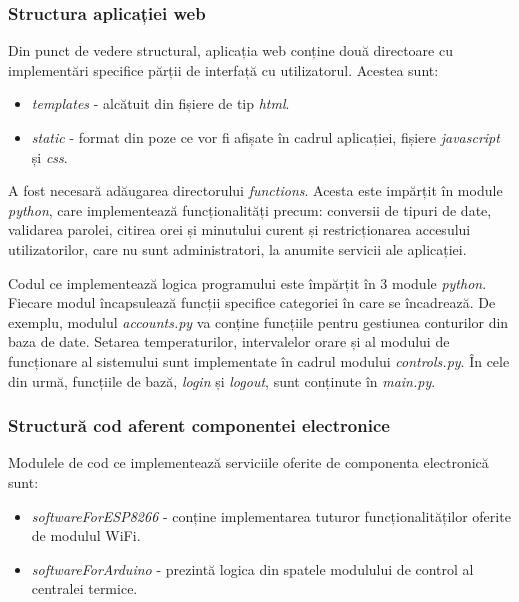 \subsubsection{Structura aplicației web}

	Din punct de vedere structural, aplicația web conține două directoare cu implementări specifice părții de interfață cu utilizatorul. Acestea sunt:
	\begin{itemize}
		\setlength{\itemindent}{2em}
			\itemsep0em
			\item \textit{templates} - alcătuit din fișiere de tip \textit{html}.
			\item \textit{static} - format din poze ce vor fi afișate în cadrul aplicației, fișiere \textit{javascript} și \textit{css}.
	\end{itemize}

	A fost necesară adăugarea directorului \textit{functions}. Acesta este impărțit în module \textit{python}, care implementează funcționalități precum: conversii de tipuri de date, validarea parolei, citirea orei și minutului curent și restricționarea accesului utilizatorilor, care nu sunt administratori, la anumite servicii ale aplicației.

	Codul ce implementează logica programului este împărțit în 3 module \textit{python}. Fiecare modul încapsulează funcții specifice categoriei în care se încadrează. De exemplu, modulul \textit{accounts.py} va conține funcțiile pentru gestiunea conturilor din baza de date. Setarea temperaturilor, intervalelor orare și al modului de funcționare al sistemului sunt implementate în cadrul modului \textit{controls.py}. În cele din urmă, funcțiile de bază, \textit{login} și \textit{logout}, sunt conținute în \textit{main.py}.     
	 
\subsubsection{Structură cod aferent componentei electronice}
	
	Modulele de cod ce implementează serviciile oferite de componenta electronică sunt:
	\begin{itemize}
		\setlength{\itemindent}{2em}
			\itemsep0em
			\item \textit{softwareForESP8266} - conține implementarea tuturor funcționalităților oferite de modulul WiFi.
			\item \textit{softwareForArduino} - prezintă logica din spatele modulului de control al centralei termice.
	\end{itemize}

